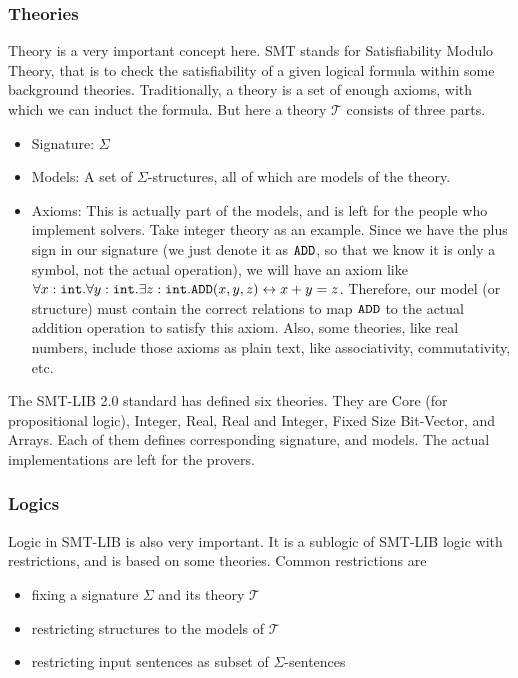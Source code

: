 \documentclass[10pt,twocolumn,letter]{article}
\theoremstyle{definition}
\begin{document}
\subsubsection{Theories}
Theory is a very important concept here. SMT stands for Satisfiability Modulo Theory, that is to check the satisfiability of a given logical formula within some background theories. Traditionally, a theory is a set of enough axioms, with which we can induct the formula. But here a theory $\mathcal{T}$ consists of three parts.
\begin{itemize}
\item Signature: $\Sigma$
\item Models: A set of $\Sigma$-structures, all of which are models of the theory.
\item Axioms: This is actually part of the models, and is left for the people who implement solvers. Take integer theory as an example. Since we have the plus sign in our signature (we just denote it as $\tt ADD$, so that we know it is only a symbol, not the actual operation), we will have an axiom like $\forall x:{\tt int}.\forall y:{\tt int}. \exists z:{\tt int}. {\tt ADD}(x,y,z) \leftrightarrow x + y = z$. Therefore, our model (or structure) must contain the correct relations to map $\tt ADD$ to the actual addition operation to satisfy this axiom. Also, some theories, like real numbers, include those axioms as plain text, like associativity, commutativity, etc.

\end{itemize}

The SMT-LIB 2.0 standard has defined six theories. They are Core (for propositional logic), Integer, Real, Real and Integer, Fixed Size Bit-Vector, and Arrays. Each of them defines corresponding signature, and models. The actual implementations are left for the provers.

\subsubsection{Logics}
Logic in SMT-LIB is also very important. It is a sublogic of SMT-LIB logic with restrictions, and is based on some theories. Common restrictions are
\begin{itemize}
\item fixing a signature $\Sigma$ and its theory $\mathcal{T}$
\item restricting structures to the models of $\mathcal{T}$
\item restricting input sentences as subset of $\Sigma$-sentences
\end{itemize}
\end{document}

